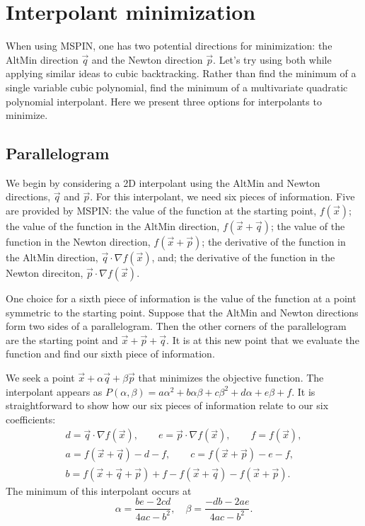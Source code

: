 \documentclass{article}
\numberwithin{equation}{section}
\begin{document}
\section{Interpolant minimization}
\label{sec: interpolant}

When using MSPIN, one has two potential directions for minimization: the AltMin direction $\vec{q}$ and the Newton direction $\vec{p}$.
Let's try using both while applying similar ideas to cubic backtracking.
Rather than find the minimum of a single variable cubic polynomial, find the minimum of a multivariate quadratic polynomial interpolant.
Here we present three options for interpolants to minimize.

\subsection{Parallelogram}
\label{subsec: para}

We begin by considering a 2D interpolant using the AltMin and Newton directions, $\vec{q}$ and $\vec{p}$.
For this interpolant, we need six pieces of information.
Five are provided by MSPIN:
the value of the function at the starting point, $f(\vec{x})$;
the value of the function in the AltMin direction, $f(\vec{x} + \vec{q})$;
the value of the function in the Newton direction, $f(\vec{x} + \vec{p})$;
the derivative of the function in the AltMin direction, $\vec{q} \cdot \nabla f(\vec{x})$, and;
the derivative of the function in the Newton direciton, $\vec{p} \cdot \nabla f(\vec{x})$.

One choice for a sixth piece of information is the value of the function at a point symmetric to the starting point.
Suppose that the AltMin and Newton directions form two sides of a parallelogram.
Then the other corners of the parallelogram are the starting point and $\vec{x} + \vec{p} + \vec{q}$.
It is at this new point that we evaluate the function and find our sixth piece of information.

We seek a point $\vec{x} + \alpha \vec{q} + \beta \vec{p}$ that minimizes the objective function.
The interpolant appears as $P(\alpha,\beta) = a \alpha^2 + b \alpha \beta + c \beta^2 + d \alpha + e \beta + f$.
It is straightforward to show how our six pieces of information relate to our six coefficients:
\begin{align*}
	d = \vec{q} \cdot \nabla f(\vec{x}), \qquad
	e = \vec{p} \cdot \nabla f(\vec{x}), \qquad
	f = f(\vec{x}), \\
	a = f(\vec{x} + \vec{q}) - d - f, \qquad
	c = f(\vec{x} + \vec{p}) - e - f, \\
	b= f(\vec{x} + \vec{q} + \vec{p}) + f - f(\vec{x} + \vec{q}) - f(\vec{x} + \vec{p}).
\end{align*}
The minimum of this interpolant occurs at
\begin{equation*}
	\alpha = \frac{be - 2cd}{4ac-b^2}, \quad \beta = \frac{-db - 2ae}{4ac-b^2}.
\end{equation*}
\end{document}
